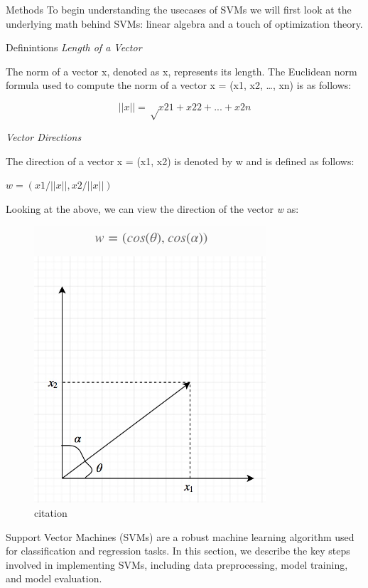 \documentclass[
  ignorenonframetext,
]{beamer}
\begin{document}
\begin{frame}{Methods}
\protect\hypertarget{methods}{}
To begin understanding the usecases of SVMs we will first look at the
underlying math behind SVMs: linear algebra and a touch of optimization
theory.

\begin{block}{Definintions}
\protect\hypertarget{definintions}{}
\emph{Length of a Vector}

The norm of a vector x, denoted as \textbar\textbar x\textbar\textbar,
represents its length. The Euclidean norm formula used to compute the
norm of a vector x = (x1, x2, \ldots, xn) is as follows:

\[
||x||= √x21+x22+...+x2n
\]

\emph{Vector Directions}

The direction of a vector x = (x1, x2) is denoted by w and is defined as
follows:

\(w = (x1/||x||,x2/||x||)\)

Looking at the above, we can view the direction of the vector \emph{w}
as:

\begin{figure}

{\centering \includegraphics{ml2.png}

}

\caption{citation}

\end{figure}

Support Vector Machines (SVMs) are a robust machine learning algorithm
used for classification and regression tasks. In this section, we
describe the key steps involved in implementing SVMs, including data
preprocessing, model training, and model evaluation.


\end{block}
\end{frame}
\end{document}
